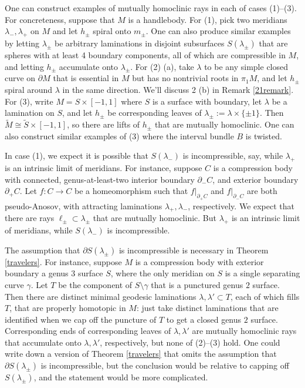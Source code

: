 \documentclass[12pt]{amsart}
\theoremstyle{definition}
\theoremstyle{remark}
\begin{document}
One can construct examples of mutually homoclinic rays in each of cases (1)--(3). For concreteness, suppose that $M$ is a handlebody.  For (1), pick two meridians $\lambda_-,\lambda_+$ on $M$ and let $h_\pm$ spiral onto $m_\pm$. One can also produce similar examples by letting $\lambda_\pm$ be arbitrary laminations in disjoint subsurfaces $S(\lambda_\pm)$ that are spheres with at least 4 boundary components, all of which are compressible in $M$, and letting $h_\pm$ accumulate onto $\lambda_\pm$. For (2) (a), take $\lambda$ to be any simple closed curve on $\partial M$ that is essential in $M$ but has no nontrivial roots in $\pi_1 M$, and let $h_\pm$ spiral around $\lambda$ in the same direction. We'll discuss 2 (b)  in Remark \ref{21remark}.  For (3), write $M = S \times [-1,1]$ where $S$ is a surface with boundary, let $\lambda$ be a lamination on $S$, and let $h_\pm$ be corresponding leaves of $\lambda_\pm := \lambda \times \{\pm 1\}$. Then $\tilde M \cong \tilde S \times [-1,1]$, so there are lifts of $h_\pm$ that are mutually homoclinic. One can also construct similar examples of (3) where the interval bundle $B$ is twisted. 

In case (1), we expect it is possible that $S(\lambda_-)$ is incompressible, say, while $\lambda_+$ is an intrinsic limit of meridians. For instance, suppose $C$ is a compression body with connected, genus-at-least-two interior boundary $\partial_- C$, and exterior boundary $\partial_+C$. Let $f : C \longrightarrow C$ be a homeomorphism such that $f|_{\partial_+ C}$ and $f|_{\partial_- C}$ are both pseudo-Anosov, with attracting laminations $\lambda_+,\lambda_-$, respectively. We expect that there are rays $\ell_\pm \subset \lambda_\pm$ that are mutually homoclinic. But $\lambda_+$ is an intrinsic limit of meridians, while $S(\lambda_-)$ is incompressible.

The assumption that $\partial S(\lambda_\pm)$ is incompressible is necessary in Theorem \ref{travelers}. For instance, suppose $M$ is a compression body with exterior boundary a genus $3$ surface $S$, where the only meridian on $S$ is a single separating curve $\gamma$. Let $T$ be the component of $S \setminus \gamma$ that is a punctured genus $2$ surface. Then there are distinct minimal geodesic laminations $\lambda,\lambda' \subset T$, each of which fills $T$, that are properly homotopic in $M$: just take distinct laminations that are identified when we cap off the puncture of $T$ to get a closed genus $2$ surface. Corresponding ends of corresponding leaves of $\lambda,\lambda'$ are mutually homoclinic rays that accumulate onto $\lambda,\lambda'$, respectively, but none of (2)--(3) hold. One could write down a version of Theorem \ref{travelers} that omits the assumption that $\partial S(\lambda_\pm)$ is incompressible, but the conclusion would be relative to capping off $S(\lambda_\pm)$, and the statement would be more complicated.
\end{document}
